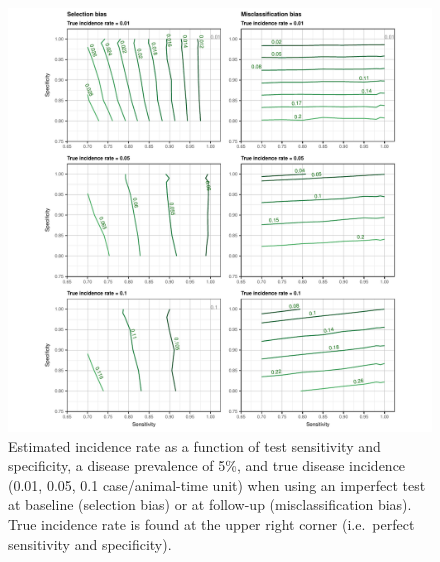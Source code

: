 \documentclass[utf8]{frontiers_suppmat} %
\begin{document}
\begin{figure}[htbp]
  \begin{center}
    \includegraphics[scale=.95]{master-incidence5_contourX-1}
    \end{center}
  \caption{Estimated incidence rate as a function of test sensitivity and
    specificity, a disease prevalence of 5\%, and true disease incidence (0.01,
    0.05, 0.1 case/animal-time unit) when using an imperfect test at baseline
    (selection bias) or at follow-up (misclassification bias). True incidence
    rate is found at the upper right corner (i.e.\ perfect sensitivity and
    specificity).}
  \label{fig:incidence_contourX5}
\end{figure}
\end{document}
